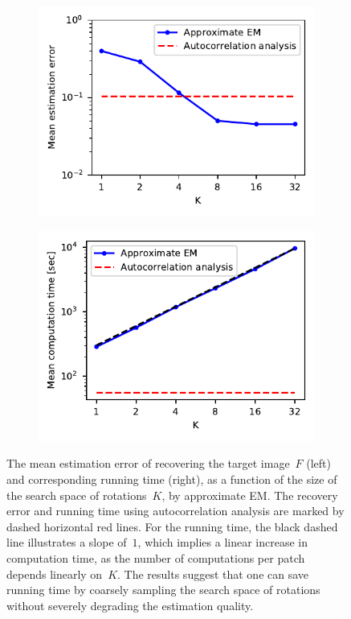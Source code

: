 \documentclass{article}
\begin{document}
\begin{figure}[!tb]
	\begin{subfigure}[ht]{.5\columnwidth}
		\centering
		\includegraphics[width=1\columnwidth]{figures/experiment_K_err.pdf}
	\end{subfigure}
	\hfill
	\begin{subfigure}[ht]{.5\columnwidth}
		\centering
		\includegraphics[width=1\columnwidth]{figures/experiment_K_time.pdf}
	\end{subfigure}
	\caption{The mean estimation error of recovering the target image~$F$ (left) and corresponding running time (right), as a function of the size of the search space of rotations~$K$, by approximate EM. The recovery error and running time using autocorrelation analysis are marked by  dashed horizontal red lines. For the running time, the black dashed line illustrates a slope of~$1$, which implies a linear increase in computation time, as the number of computations per patch depends linearly on~$K$. The results suggest that one can save running time by coarsely sampling  the search space of rotations  without severely degrading  the estimation quality.}
	\label{fig:discretization_experiment}
\end{figure}
\end{document}
